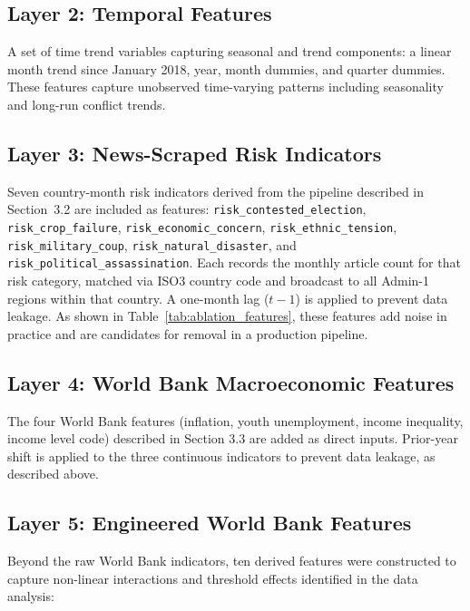 \documentclass[12pt,a4paper]{article}
\begin{document}
\subsection{Layer 2: Temporal Features}

A set of time trend variables capturing seasonal and trend components:
a linear month trend since January 2018, year, month dummies, and quarter
dummies. These features capture unobserved time-varying patterns including
seasonality and long-run conflict trends.

\subsection{Layer 3: News-Scraped Risk Indicators}

Seven country-month risk indicators derived from the pipeline described
in Section~3.2 are included as features:
\texttt{risk\_contested\_election},
\texttt{risk\_crop\_failure},
\texttt{risk\_economic\_concern},
\texttt{risk\_ethnic\_tension},
\texttt{risk\_military\_coup},
\texttt{risk\_natural\_disaster}, and
\texttt{risk\_political\_assassination}.
Each records the monthly article count for that risk category,
matched via ISO3 country code and broadcast to all Admin-1 regions
within that country. A one-month lag ($t-1$) is applied to prevent
data leakage. As shown in Table~\ref{tab:ablation_features}, these
features add noise in practice and are candidates for removal in a
production pipeline.

\subsection{Layer 4: World Bank Macroeconomic Features}

The four World Bank features (inflation, youth unemployment, income
inequality, income level code) described in Section 3.3 are added as
direct inputs. Prior-year shift is applied to the three continuous
indicators to prevent data leakage, as described above.

\subsection{Layer 5: Engineered World Bank Features}

Beyond the raw World Bank indicators, ten derived features were
constructed to capture non-linear interactions and threshold effects
identified in the data analysis:
\end{document}
